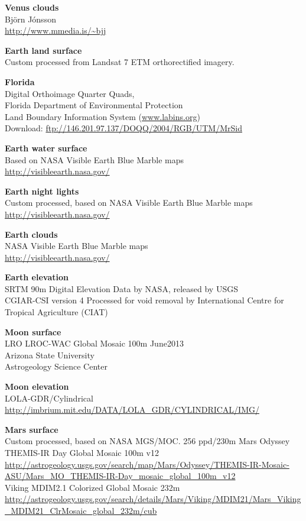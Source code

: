 \documentclass[Orbiter User Manual.tex]{subfiles}
\begin{document}
\textbf{Venus clouds}\\
Björn Jónsson\\
\url{http://www.mmedia.is/~bjj}

\textbf{Earth land surface}\\
Custom processed from Landsat 7 ETM orthorectified imagery.

\textbf{Florida}\\
Digital Orthoimage Quarter Quads,\\
Florida Department of Environmental Protection\\
Land Boundary Information System (\url{www.labins.org})\\
Download: \url{ftp://146.201.97.137/DOQQ/2004/RGB/UTM/MrSid}

\textbf{Earth water surface}\\
Based on NASA Visible Earth Blue Marble maps\\
\url{http://visibleearth.nasa.gov/}

\textbf{Earth night lights}\\
Custom processed, based on NASA Visible Earth Blue Marble maps\\
\url{http://visibleearth.nasa.gov/}

\textbf{Earth clouds}\\
NASA Visible Earth Blue Marble maps\\
\url{http://visibleearth.nasa.gov/}

\textbf{Earth elevation}\\
SRTM 90m Digital Elevation Data by NASA, released by USGS\\
CGIAR-CSI version 4 Processed for void removal by International Centre for
Tropical Agriculture (CIAT)

\textbf{Moon surface}\\
LRO LROC-WAC Global Mosaic 100m June2013\\
Arizona State University\\
Astrogeology Science Center

\textbf{Moon elevation}\\
LOLA-GDR/Cylindrical\\
\url{http://imbrium.mit.edu/DATA/LOLA_GDR/CYLINDRICAL/IMG/}

\textbf{Mars surface}\\
Custom processed, based on NASA MGS/MOC. 256 ppd/230m Mars Odyssey THEMIS-IR Day
Global Mosaic 100m v12\\
\url{http://astrogeology.usgs.gov/search/map/Mars/Odyssey/THEMIS-IR-Mosaic-ASU/Mars_MO_THEMIS-IR-Day_mosaic_global_100m_v12}\\
Viking MDIM2.1 Colorized Global Mosaic 232m\\
\url{http://astrogeology.usgs.gov/search/details/Mars/Viking/MDIM21/Mars_Viking_MDIM21_ClrMosaic_global_232m/cub}
\end{document}
